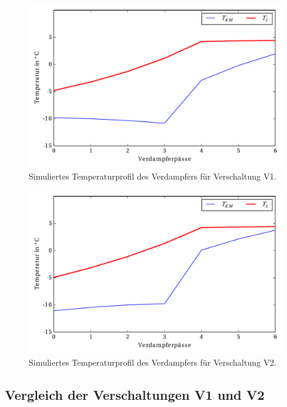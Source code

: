 \begin{figure}[h!]
\centering
\includegraphics[scale=0.8]{Pictures/Temp_V11.pdf}
\caption{Simuliertes Temperaturprofil des Verdampfers für Verschaltung V1.}
\label{fig:SimTempV1}
\end{figure}

\begin{figure}[h!]
\centering
\includegraphics[scale=0.8]{Pictures/Temp_V21.pdf}
\caption{Simuliertes Temperaturprofil des Verdampfers für Verschaltung V2.}
\label{fig:SimTempV2}
\end{figure}
\subsection{Vergleich der Verschaltungen V1 und V2}
\label{subsec:Vergleich der Verschaltungen V1 und V2}

